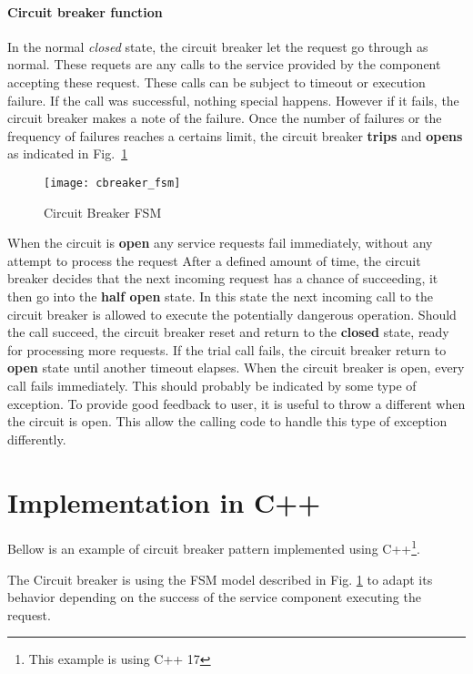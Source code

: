 \documentclass[a4paper,12pt]{article}
\begin{document}
  \paragraph{ Circuit breaker function}
    In the normal \textit{closed} state, the circuit breaker let the request go through as normal.
    These requets are any calls to the service provided by the component accepting these request.
    These calls can be subject to timeout or execution failure. If the call was successful, nothing special
    happens. However if it fails, the circuit breaker makes a note of the failure. Once the number of failures or the 
    frequency of failures reaches a certains limit, the circuit breaker \textbf{trips} and \textbf{opens} as indicated 
    in Fig.~\ref{fig:fsm}
    \label{cbreaker_fsm}
    \begin{center}
      \begin{figure}
      \texttt{[image: cbreaker\_fsm]}
      \caption{Circuit Breaker FSM}\label{fig:fsm}
      
      \end{figure}
      
    \end{center}
    When the circuit is \textbf{open} any service requests fail immediately, without any attempt to process the request
    After a defined amount of time, the circuit breaker decides that the next incoming request has a chance of succeeding, it then go into the \textbf{half open} state. In this state  the next incoming call to the circuit breaker 
    is allowed to execute the potentially dangerous operation. Should the call succeed, the circuit breaker reset and return to the \textbf{closed} state, ready for processing more requests. If the trial call fails, the circuit breaker 
    return to \textbf{open} state until another timeout elapses.
    When the circuit breaker is open, every call fails immediately. This should probably be indicated by some type of 
    exception. To provide good feedback to user, it is useful to throw a different when the circuit is open. This allow
    the calling code to handle this type of exception differently.
  \newpage
   \section{Implementation in C++}
   Bellow is an example of circuit breaker pattern implemented using C++\footnote{This example is using C++ 17}.
   
    The Circuit breaker is using the FSM model described in Fig. \ref{fig:fsm} to adapt its behavior depending on the success of the service component executing the request.
    
\end{document}
